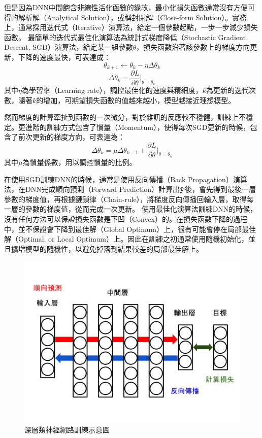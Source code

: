 但是因為DNN中間飽含非線性活化函數的緣故，最小化損失函數通常沒有方便可得的解析解（Analytical Solution），或稱封閉解（Close-form Solution）。實務上，通常採用迭代式（Iterative）演算法，給定一個參數起點，一步一步減少損失函數。
最簡單的迭代式最佳化演算法為統計式梯度降低（Stochastic Gradient Descent, SGD）演算法，給定某一組參數$\theta$，損失函數沿著該參數上的梯度方向更新，下降的速度最快，可表達成：
\begin{equation}
\theta_{k+1} \leftarrow \theta_k - \eta \Delta \theta_{k} 
\end{equation}
\begin{equation}
\Delta \theta_{k} = \frac{\partial L}{\partial \theta} \biggr|_{\theta = \theta_k}
\end{equation}
其中$\eta$為學習率（Learning rate），調控最佳化的速度與精細度，$k$為更新的迭代次數，隨著$k$的增加，可期望損失函數的值越來越小，模型越接近理想模型。

然而梯度的計算牽扯到函數的一次微分，對於雜訊的反應較不穩健，訓練上不穩定。更進階的訓練方式包含了慣量（Momentum），使得每次SGD更新的時候，包含了前次更新的梯度方向，可表達為：
\begin{equation}
\Delta \theta_{k} =  \mu \Delta \theta_{k-1} + \frac{\partial L}{\partial \theta} \biggr|_{\theta = \theta_k}
\end{equation}
其中$\mu$為慣量係數，用以調控慣量的比例。

在使用SGD訓練DNN的時候，通常是使用反向傳播（Back Propagation）演算法，在DNN完成順向預測（Forward Prediction）計算出$\hat{\bold{y}}$後，會先得到最後一層參數的梯度值，再根據鏈鎖律（Chain-rule），將梯度反向傳播回輸入層，取得每一層的參數的梯度值，從而完成一次更新。
使用最佳化演算法訓練DNN的時候，沒有任何方法可以保證損失函數是下凹（Convex）的。在損失函數下降的過程中，並不保證會下降到最佳解（Global Optimum）上，很有可能會停在局部最佳解（Optimal, or Local Optimum）上。因此在訓練之初通常使用隨機初始化，並且擴增模型的隨機性，以避免掉落到結果較差的局部最佳解上。

\begin{figure}
\centering
\includegraphics[scale=0.35]{images/chap2_dnn.png}
\caption{深層類神經網路訓練示意圖}
\label{fig:chap2_dnn}
\end{figure}

